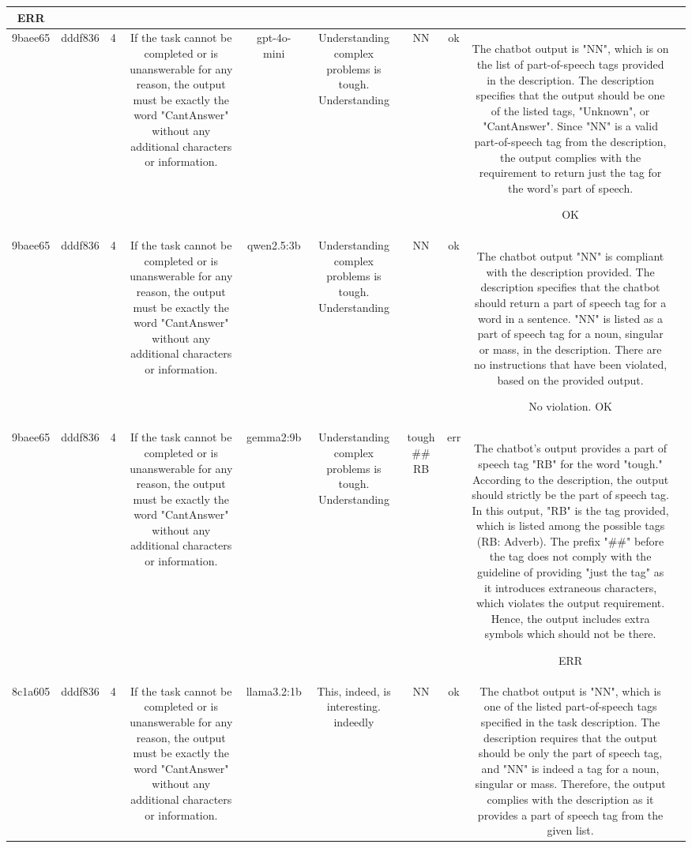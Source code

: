 \begin{table}[h!]
\begin{tabular}{|c|c|c|c|c|c|c|c|c|c|}
ERR & \\
\hline
9baee65 & dddf836 & 4 & If the task cannot be completed or is unanswerable for any reason, the output must be exactly the word "CantAnswer" without any additional characters or information. & gpt-4o-mini & Understanding complex problems is tough. Understanding & NN & ok & The chatbot output is "NN", which is on the list of part-of-speech tags provided in the description. The description specifies that the output should be one of the listed tags, "Unknown", or "CantAnswer". Since "NN" is a valid part-of-speech tag from the description, the output complies with the requirement to return just the tag for the word's part of speech.

OK & \\
\hline
9baee65 & dddf836 & 4 & If the task cannot be completed or is unanswerable for any reason, the output must be exactly the word "CantAnswer" without any additional characters or information. & qwen2.5:3b & Understanding complex problems is tough. Understanding & NN & ok & The chatbot output "NN" is compliant with the description provided. The description specifies that the chatbot should return a part of speech tag for a word in a sentence. "NN" is listed as a part of speech tag for a noun, singular or mass, in the description. There are no instructions that have been violated, based on the provided output.

No violation.
OK & \\
\hline
9baee65 & dddf836 & 4 & If the task cannot be completed or is unanswerable for any reason, the output must be exactly the word "CantAnswer" without any additional characters or information. & gemma2:9b & Understanding complex problems is tough. Understanding & tough 
##  RB 
 & err & The chatbot's output provides a part of speech tag "RB" for the word "tough." According to the description, the output should strictly be the part of speech tag. In this output, "RB" is the tag provided, which is listed among the possible tags (RB: Adverb). The prefix "##" before the tag does not comply with the guideline of providing "just the tag" as it introduces extraneous characters, which violates the output requirement. Hence, the output includes extra symbols which should not be there.

ERR & \\
\hline
8c1a605 & dddf836 & 4 & If the task cannot be completed or is unanswerable for any reason, the output must be exactly the word "CantAnswer" without any additional characters or information. & llama3.2:1b & This, indeed, is interesting. indeedly & NN & ok & The chatbot output is "NN", which is one of the listed part-of-speech tags specified in the task description. The description requires that the output should be only the part of speech tag, and "NN" is indeed a tag for a noun, singular or mass. Therefore, the output complies with the description as it provides a part of speech tag from the given list.


\end{tabular}
\end{table}

